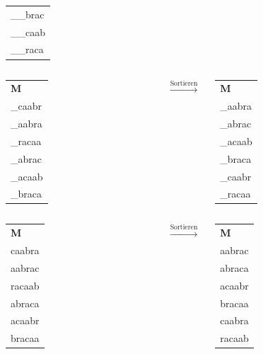 \documentclass[14pt,xcolor=dvipsnames,pdftex]{beamer}
\begin{document}
\begin{frame}[allowframebreaks]
\begin{columns}
\begin{tabular}{T}
    \_\_brac\\
    \_\_caab\\
    \_\_raca
  \end{tabular}
\end{columns}
\framebreak
\begin{columns}
 \begin{tabular}{T}
    \textbf{M} \\
    \_{\color{red}c}aabr\\
    \_{\color{red}a}abra\\
    \_{\color{red}r}acaa\\
    \_{\color{red}a}brac\\
    \_{\color{red}a}caab\\
    \_{\color{red}b}raca
  \end{tabular}
 $\xrightarrow{\text{Sortieren}}$
 \begin{tabular}{T}
    \textbf{M} \\
    \_aabra\\
    \_abrac\\
    \_acaab\\
    \_braca\\
    \_caabr\\
    \_racaa
  \end{tabular}
\end{columns}
\framebreak
\begin{columns}
 \begin{tabular}{T}
    \textbf{M} \\
    {\color{red}c}aabra\\
    {\color{red}a}abrac\\
    {\color{red}r}acaab\\
    {\color{red}a}braca\\
    {\color{red}a}caabr\\
    {\color{red}b}racaa
  \end{tabular}
 $\xrightarrow{\text{Sortieren}}$
 \begin{tabular}{T}
    \textbf{M} \\
    aabrac\\
    abraca\\
    acaabr\\
    bracaa\\
    caabra\\
    racaab
  \end{tabular}

\end{columns}
\end{frame}
\end{document}
